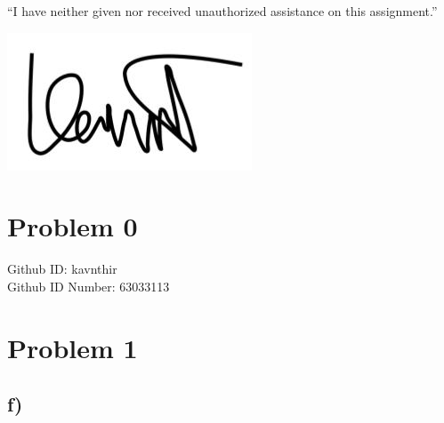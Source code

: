 \documentclass{article}
\begin{document}
\begin{center}
    “I have neither given nor received unauthorized assistance on this assignment.”
    
    \includegraphics[width = .1\textwidth]{Signature.jpg}
\end{center}
\section*{Problem 0}
\begin{center}
    Github ID: kavnthir\\
    Github ID Number: 63033113
\end{center} 
\section*{Problem 1}
\subsection*{f)}
\begin{center}
\end{center}
\end{document}
